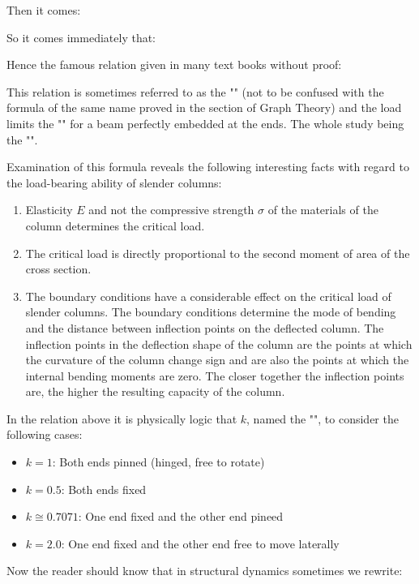 	Then it comes:
	
	So it comes immediately that:
	
	Hence the famous relation given in many text books without proof:
	
	This relation is sometimes referred to as the "" (not to be confused with the formula of the same name proved in the section of Graph Theory) and the load limits the "" for a beam perfectly embedded at the ends. The whole study being the "".
	
	Examination of this formula reveals the following interesting facts with regard to the load-bearing ability of slender columns:
	 \begin{enumerate}
		\item Elasticity $E$ and not the compressive strength $\sigma$ of the materials of the column determines the critical load.

		\item The critical load is directly proportional to the second moment of area of the cross section.

		\item The boundary conditions have a considerable effect on the critical load of slender columns. The boundary conditions determine the mode of bending and the distance between inflection points on the deflected column. The inflection points in the deflection shape of the column are the points at which the curvature of the column change sign and are also the points at which the internal bending moments are zero. The closer together the inflection points are, the higher the resulting capacity of the column.
	\end{enumerate}
	
	In the relation above it is physically logic that $k$, named the "", to consider the following cases:
	\begin{itemize}
		\item $k=1$: Both ends pinned (hinged, free to rotate)
		\item $k=0.5$: Both ends fixed
		\item $k\cong 0.7071$: One end fixed and the other end pineed
		\item $k=2.0$: One end fixed and the other end free to move laterally
	\end{itemize}
	Now the reader should know that in structural dynamics sometimes we rewrite:
	
